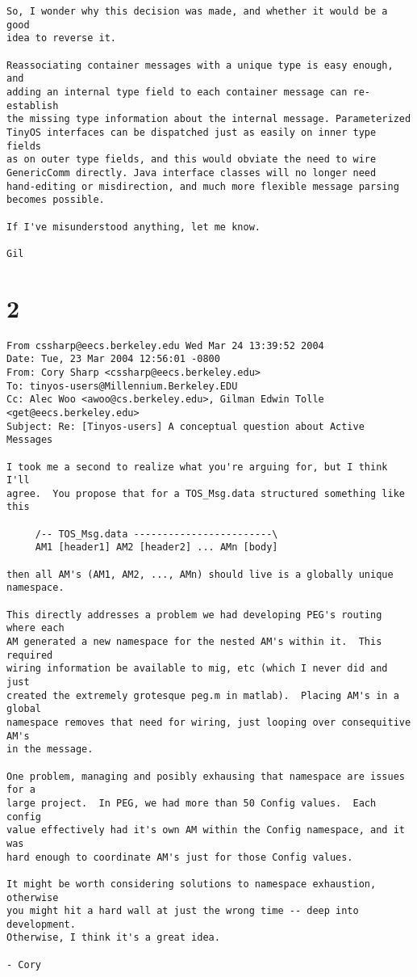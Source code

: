 \documentclass[10pt]{article}
\begin{document}
\begin{verbatim}
So, I wonder why this decision was made, and whether it would be a good 
idea to reverse it.

Reassociating container messages with a unique type is easy enough, and 
adding an internal type field to each container message can re-establish 
the missing type information about the internal message. Parameterized 
TinyOS interfaces can be dispatched just as easily on inner type fields 
as on outer type fields, and this would obviate the need to wire 
GenericComm directly. Java interface classes will no longer need 
hand-editing or misdirection, and much more flexible message parsing 
becomes possible.

If I've misunderstood anything, let me know.

Gil

\end{verbatim}



\section*{2}

\begin{verbatim}
From cssharp@eecs.berkeley.edu Wed Mar 24 13:39:52 2004
Date: Tue, 23 Mar 2004 12:56:01 -0800
From: Cory Sharp <cssharp@eecs.berkeley.edu>
To: tinyos-users@Millennium.Berkeley.EDU
Cc: Alec Woo <awoo@cs.berkeley.edu>, Gilman Edwin Tolle <get@eecs.berkeley.edu>
Subject: Re: [Tinyos-users] A conceptual question about Active Messages

I took me a second to realize what you're arguing for, but I think I'll 
agree.  You propose that for a TOS_Msg.data structured something like this

     /-- TOS_Msg.data ------------------------\
     AM1 [header1] AM2 [header2] ... AMn [body]

then all AM's (AM1, AM2, ..., AMn) should live is a globally unique namespace.

This directly addresses a problem we had developing PEG's routing where each 
AM generated a new namespace for the nested AM's within it.  This required 
wiring information be available to mig, etc (which I never did and just 
created the extremely grotesque peg.m in matlab).  Placing AM's in a global 
namespace removes that need for wiring, just looping over consequitive AM's 
in the message.

One problem, managing and posibly exhausing that namespace are issues for a 
large project.  In PEG, we had more than 50 Config values.  Each config 
value effectively had it's own AM within the Config namespace, and it was 
hard enough to coordinate AM's just for those Config values.

It might be worth considering solutions to namespace exhaustion, otherwise 
you might hit a hard wall at just the wrong time -- deep into development. 
Otherwise, I think it's a great idea.

- Cory
\end{verbatim}
\end{document}
